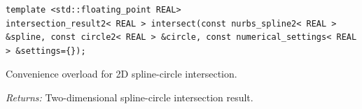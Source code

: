 \par\noindent\begin{minipage}{\linewidth}
\begin{lstlisting}[style=apireference]
template <std::floating_point REAL>
intersection_result2< REAL > intersect(const nurbs_spline2< REAL > &spline, const circle2< REAL > &circle, const numerical_settings< REAL > &settings={});
\end{lstlisting}
{\footnotesize Convenience overload for 2D spline-circle intersection.\par}
{\footnotesize\textit{Returns:} Two-dimensional spline-circle intersection result.\par}
\end{minipage}\par\vspace{1pt}
